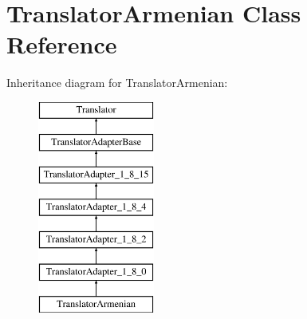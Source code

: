 \hypertarget{class_translator_armenian}{}\section{Translator\+Armenian Class Reference}
\label{class_translator_armenian}
Inheritance diagram for Translator\+Armenian\+:\begin{figure}[H]
\begin{center}
\leavevmode
\includegraphics[height=7.000000cm]{class_translator_armenian}
\end{center}
\end{figure}

